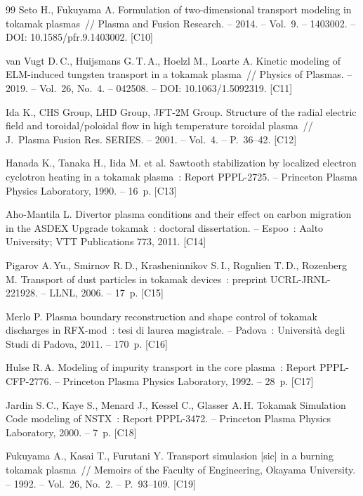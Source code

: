 \begin{thebibliography}{99}
 Seto H., Fukuyama A. Formulation of two-dimensional transport
  modeling in tokamak plasmas~// Plasma and Fusion Research. -- 2014. -- Vol.~9. --
  1403002. -- DOI: 10.1585/pfr.9.1403002. [C10]

 van Vugt D.\,C., Huijsmans G.\,T.\,A., Hoelzl M., Loarte A.
  Kinetic modeling of ELM-induced tungsten transport in a tokamak plasma~// Physics of
  Plasmas. -- 2019. -- Vol.~26, No.~4. -- 042508. -- DOI: 10.1063/1.5092319. [C11]

 Ida K., CHS Group, LHD Group, JFT-2M Group. Structure of the radial
  electric field and toroidal/poloidal flow in high temperature toroidal plasma~//
  J.~Plasma Fusion Res. SERIES. -- 2001. -- Vol.~4. -- P.~36--42. [C12]

 Hanada K., Tanaka H., Iida M. et al. Sawtooth stabilization by
  localized electron cyclotron heating in a tokamak plasma~: Report PPPL-2725. --
  Princeton Plasma Physics Laboratory, 1990. -- 16~p. [C13]

 Aho-Mantila L. Divertor plasma conditions and their effect on
  carbon migration in the ASDEX Upgrade tokamak~: doctoral dissertation. -- Espoo~:
  Aalto University; VTT Publications 773, 2011. [C14]

 Pigarov A.\,Yu., Smirnov R.\,D., Krasheninnikov S.\,I.,
  Rognlien T.\,D., Rozenberg M. Transport of dust particles in tokamak devices~:
  preprint UCRL-JRNL-221928. -- LLNL, 2006. -- 17~p. [C15]

 Merlo P. Plasma boundary reconstruction and shape control of
  tokamak discharges in RFX-mod~: tesi di laurea magistrale. -- Padova~: Università
  degli Studi di Padova, 2011. -- 170~p. [C16]

 Hulse R.\,A. Modeling of impurity transport in the core plasma~:
  Report PPPL-CFP-2776. -- Princeton Plasma Physics Laboratory, 1992. -- 28~p. [C17]

 Jardin S.\,C., Kaye S., Menard J., Kessel C., Glasser A.\,H.
  Tokamak Simulation Code modeling of NSTX~: Report PPPL-3472. -- Princeton Plasma
  Physics Laboratory, 2000. -- 7~p. [C18]

 Fukuyama A., Kasai T., Furutani Y. Transport simulasion [sic]
  in a burning tokamak plasma~// Memoirs of the Faculty of Engineering, Okayama
  University. -- 1992. -- Vol.~26, No.~2. -- P.~93--109. [C19]


\end{thebibliography}
